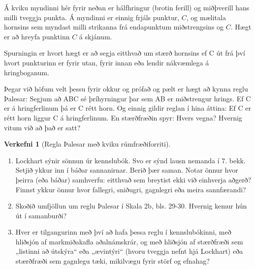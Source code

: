 \documentclass[
  icelandic,
]{book}
\providecommand{\tightlist}{%
  \setlength{\itemsep}{0pt}\setlength{\parskip}{0pt}}
\theoremstyle{definition}
\theoremstyle{definition}
\theoremstyle{definition}
\newtheorem{exercise}{Verkefni}[chapter]
\theoremstyle{definition}
\theoremstyle{remark}
\begin{document}
Á kviku myndinni hér fyrir neðan er hálfhringur (brotin ferill) og miðþverill hans milli tveggja punkta. Á myndinni er einnig frjáls punktur, \(C\), og mælitala hornsins sem myndast milli strikanna frá endapunktum miðstrengsins og \(C\). Hægt er að hreyfa punktinn \(C\) á skjánum.

Spurningin er hvort hægt er að segja eitthvað um stærð hornsins ef C út frá því hvort punkturinn er fyrir utan, fyrir innan eða lendir nákvæmlega á hringboganum.

Þegar við höfum velt þessu fyrir okkur og prófað og pælt er hægt að kynna reglu Þalesar: Segjum að ABC sé þríhyrningur þar sem AB er miðstrengur hrings. Ef C er á hringferlinum þá er C rétt horn. Og einnig gildir reglan í hina áttina: Ef C er rétt horn liggur C á hringferlinum. En stærðfræðin spyr: Hvers vegna? Hvernig vitum við að það er satt?

\begin{exercise}[Regla Þalesar með kviku rúmfræðiforriti]
\protect\hypertarget{exr:exr-thales-geogebra}{}\label{exr:exr-thales-geogebra}\leavevmode

\begin{enumerate}
\def\labelenumi{\alph{enumi}.}
\tightlist
\item
  Lockhart sýnir sönnun úr kennslubók. Svo er sýnd lausn nemanda í 7. bekk. Setjið ykkur inn í báðar sannanirnar. Berið þær saman. Notar önnur hvor þeirra (eða báðar) samhverfu: eitthvað sem breytist ekki við einhverja aðgerð? Finnst ykkur önnur hvor fallegri, sniðugri, gagnlegri eða meira sannfærandi?
\item
  Skoðið umfjöllun um reglu Þalesar í Skala 2b, bls. 29-30. Hvernig kemur hún út í samanburði?
\item
  Hver er tilgangurinn með því að hafa þessa reglu í kennslubókinni, með hliðsjón af markmiðakafla aðalnámskrár, og með hliðsjón af stærðfræði sem „listinni að útskýra`` eða „ævintýri`` (hvoru tveggja nefnt hjá Lockhart) eða stærðfræði sem gagnlegu tæki, mikilvægu fyrir störf og efnahag?
\end{enumerate}

\end{exercise}

\printbibliography
\end{document}
